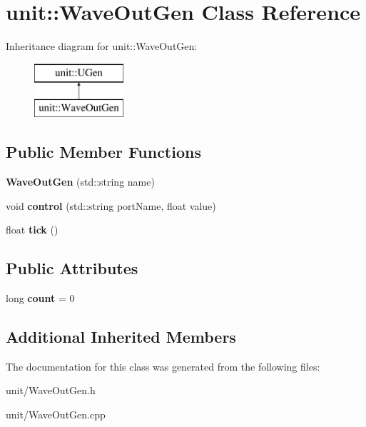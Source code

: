 \hypertarget{classunit_1_1WaveOutGen}{}\section{unit\+:\+:Wave\+Out\+Gen Class Reference}
\label{classunit_1_1WaveOutGen}
Inheritance diagram for unit\+:\+:Wave\+Out\+Gen\+:\begin{figure}[H]
\begin{center}
\leavevmode
\includegraphics[height=2.000000cm]{classunit_1_1WaveOutGen}
\end{center}
\end{figure}
\subsection*{Public Member Functions}
\begin{DoxyCompactItemize}
\item 
{\bfseries Wave\+Out\+Gen} (std\+::string name)\hypertarget{classunit_1_1WaveOutGen_af7b0343212eb3de1ed4ef2dad90ad43e}{}\label{classunit_1_1WaveOutGen_af7b0343212eb3de1ed4ef2dad90ad43e}

\item 
void {\bfseries control} (std\+::string port\+Name, float value)\hypertarget{classunit_1_1WaveOutGen_a919d71ae0729553b3bd1799add9d1088}{}\label{classunit_1_1WaveOutGen_a919d71ae0729553b3bd1799add9d1088}

\item 
float {\bfseries tick} ()\hypertarget{classunit_1_1WaveOutGen_a468581d97aaf471e6516aee2cdb630cd}{}\label{classunit_1_1WaveOutGen_a468581d97aaf471e6516aee2cdb630cd}

\end{DoxyCompactItemize}
\subsection*{Public Attributes}
\begin{DoxyCompactItemize}
\item 
long {\bfseries count} = 0\hypertarget{classunit_1_1WaveOutGen_ad8ec171f5fa4fabc328b69a2509fde0f}{}\label{classunit_1_1WaveOutGen_ad8ec171f5fa4fabc328b69a2509fde0f}

\end{DoxyCompactItemize}
\subsection*{Additional Inherited Members}


The documentation for this class was generated from the following files\+:\begin{DoxyCompactItemize}
\item 
unit/Wave\+Out\+Gen.\+h\item 
unit/Wave\+Out\+Gen.\+cpp\end{DoxyCompactItemize}
